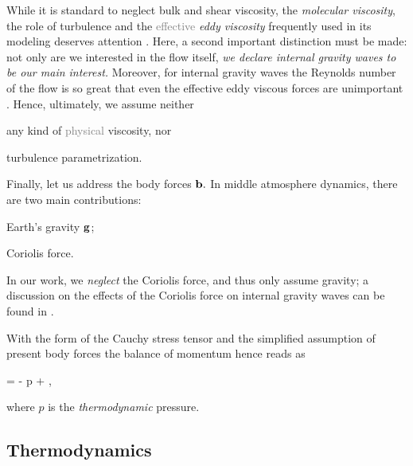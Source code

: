 \documentclass[../main.tex]{subfiles}
\begin{document}
While it is standard to neglect bulk and shear viscosity, \ie the \emph{molecular viscosity}, the role of turbulence and the \textcolor{gray}{effective} \emph{eddy viscosity} frequently used in its modeling deserves attention \autocite[p.~5]{smagorinskyGENERALCIRCULATIONEXPERIMENTS1963}\autocite[p.~93]{popeTurbulentFlows2000}. Here, a second important distinction must be made: not only are we interested in the flow itself, \emph{we declare internal gravity waves to be our main interest.} Moreover, for internal gravity waves the Reynolds number of the flow is so great that even the effective eddy viscous forces are unimportant \autocite[p.~30]{sutherlandInternalGravityWaves2010}. Hence, ultimately, we assume neither \begin{inparaenum} \item any kind of \textcolor{gray}{physical} viscosity\sidenotemark, nor \item turbulence parametrization. \end{inparaenum} 

Finally, let us address the body forces $\mathbf{b}.$ In middle atmosphere dynamics, there are two main contributions: \begin{inparaenum} \item Earth's gravity $\mathbf{g}$; \item Coriolis force. \end{inparaenum} In our work, we \emph{neglect} the Coriolis force, and thus only assume gravity; a discussion on the effects of the Coriolis force on internal gravity waves can be found in \autocite[p.~206]{sutherlandInternalGravityWaves2010}.

With the form of the Cauchy stress tensor  and the simplified assumption of present body forces the balance of momentum  hence reads as

\begin{equations}[single,!,numberline=all]
\label{eq:MOMENTUM_EQ}
\rho {} = - \grad p + \rho {},
\end{equations}

where $p$ is the \emph{thermodynamic} pressure. 

\subsection{Thermodynamics}
\label{sec:THERMODYNAMICS}
\end{document}
